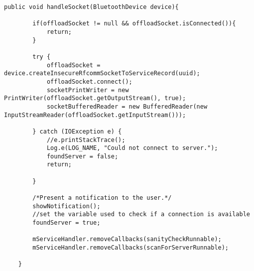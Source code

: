 \begin{lstlisting}
public void handleSocket(BluetoothDevice device){

        if(offloadSocket != null && offloadSocket.isConnected()){
            return;
        }

        try {
            offloadSocket = device.createInsecureRfcommSocketToServiceRecord(uuid);
            offloadSocket.connect();
            socketPrintWriter = new PrintWriter(offloadSocket.getOutputStream(), true);
            socketBufferedReader = new BufferedReader(new InputStreamReader(offloadSocket.getInputStream()));

        } catch (IOException e) {
            //e.printStackTrace();
            Log.e(LOG_NAME, "Could not connect to server.");
            foundServer = false;
            return;

        }

		/*Present a notification to the user.*/
        showNotification();
        //set the variable used to check if a connection is available
        foundServer = true;
        
        mServiceHandler.removeCallbacks(sanityCheckRunnable);
        mServiceHandler.removeCallbacks(scanForServerRunnable);
        
    }
\end{lstlisting}